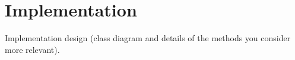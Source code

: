 \section{Implementation}

 Implementation design (class diagram and details of the methods you consider more
relevant).